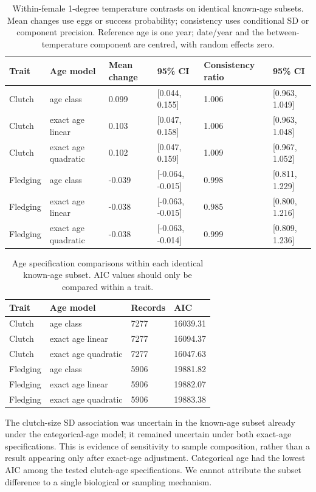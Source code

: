 \documentclass{article}
\begin{document}
\begin{table}[!ht]\centering\scriptsize\singlespacing
\caption{Within-female 1-degree temperature contrasts on identical known-age subsets. Mean changes use eggs or success probability; consistency uses conditional SD or component precision. Reference age is one year; date/year and the between-temperature component are centred, with random effects zero.}\label{tab:age-sensitivity}
\begin{tabular}{llllll}\toprule
Trait & Age model & Mean change & 95\% CI & Consistency ratio & 95\% CI\\\midrule
Clutch & age class & 0.099 & [0.044, 0.155] & 1.006 & [0.963, 1.049]\\
Clutch & exact age linear & 0.103 & [0.047, 0.158] & 1.006 & [0.963, 1.048]\\
Clutch & exact age quadratic & 0.102 & [0.047, 0.159] & 1.009 & [0.967, 1.052]\\
Fledging & age class & -0.039 & [-0.064, -0.015] & 0.998 & [0.811, 1.229]\\
Fledging & exact age linear & -0.038 & [-0.063, -0.015] & 0.985 & [0.800, 1.216]\\
Fledging & exact age quadratic & -0.038 & [-0.063, -0.014] & 0.999 & [0.809, 1.236]\\
\bottomrule\end{tabular}\end{table}
\begin{table}[!ht]\centering\scriptsize\singlespacing
\caption{Age specification comparisons within each identical known-age subset. AIC values should only be compared within a trait.}\label{tab:age-aic}
\begin{tabular}{llll}\toprule
Trait & Age model & Records & AIC\\\midrule
Clutch & age class & 7277 & 16039.31\\
Clutch & exact age linear & 7277 & 16094.37\\
Clutch & exact age quadratic & 7277 & 16047.63\\
Fledging & age class & 5906 & 19881.82\\
Fledging & exact age linear & 5906 & 19882.07\\
Fledging & exact age quadratic & 5906 & 19883.38\\
\bottomrule\end{tabular}\end{table}
The clutch-size SD association was uncertain in the known-age subset already under the categorical-age model; it remained uncertain under both exact-age specifications. This is evidence of sensitivity to sample composition, rather than a result appearing only after exact-age adjustment. Categorical age had the lowest AIC among the tested clutch-age specifications. We cannot attribute the subset difference to a single biological or sampling mechanism.
\end{document}
